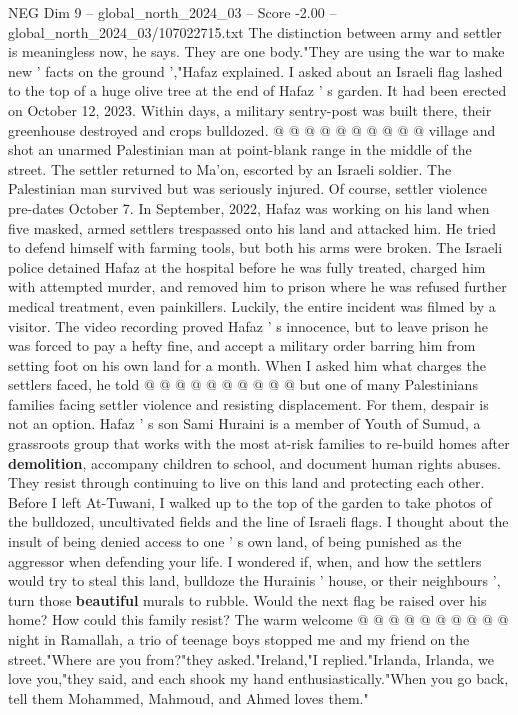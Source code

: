\begin{textsample}{NEG Dim 9 – global\_north\_2024\_03 – Score -2.00 – global\_north\_2024\_03/107022715.txt}
The distinction between army and settler is meaningless now, he says.
They are one body."They are using the war to make new ' facts on the ground ',"Hafaz explained.
I asked about an Israeli flag lashed to the top of a huge olive tree at the end of Hafaz ' s garden.
It had been erected on October 12, 2023.
Within days, a military sentry-post was built there, their greenhouse destroyed and crops bulldozed. @ @ @ @ @ @ @ @ @ @ village and shot an unarmed Palestinian man at point-blank range in the middle of the street.
The settler returned to Ma'on, escorted by an Israeli soldier.
The Palestinian man survived but was seriously injured.
Of course, settler violence pre-dates October 7.
In September, 2022, Hafaz was working on his land when five masked, armed settlers trespassed onto his land and attacked him.
He tried to defend himself with farming tools, but both his arms were broken.
The Israeli police detained Hafaz at the hospital before he was fully treated, charged him with attempted murder, and removed him to prison where he was refused further medical treatment, even painkillers.
Luckily, the entire incident was filmed by a visitor.
The video recording proved Hafaz ' s innocence, but to leave prison he was forced to pay a hefty fine, and accept a military order barring him from setting foot on his own land for a month.
When I asked him what charges the settlers faced, he told @ @ @ @ @ @ @ @ @ @ but one of many Palestinians families facing settler violence and resisting displacement.
For them, despair is not an option.
Hafaz ' s son Sami Huraini is a member of Youth of Sumud, a grassroots group that works with the most at-risk families to re-build homes after \textbf{demolition}, accompany children to school, and document human rights abuses.
They resist through continuing to live on this land and protecting each other.
Before I left At-Tuwani, I walked up to the top of the garden to take photos of the bulldozed, uncultivated fields and the line of Israeli flags.
I thought about the insult of being denied access to one ' s own land, of being punished as the aggressor when defending your life.
I wondered if, when, and how the settlers would try to steal this land, bulldoze the Hurainis ' house, or their neighbours ', turn those \textbf{beautiful} murals to rubble.
Would the next flag be raised over his home?
How could this family resist?
The warm welcome @ @ @ @ @ @ @ @ @ @ night in Ramallah, a trio of teenage boys stopped me and my friend on the street."Where are you from?"they asked."Ireland,"I replied."Irlanda, Irlanda, we love you,"they said, and each shook my hand enthusiastically."When you go back, tell them Mohammed, Mahmoud, and Ahmed loves them."

\end{textsample}
